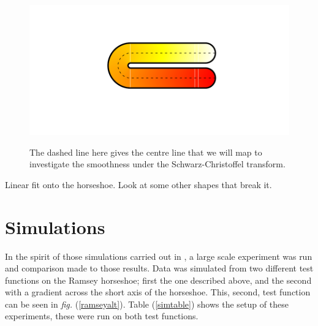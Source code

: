 \documentclass[a4paper,10pt]{amsart}
\newcommand{\sch}{Schwarz-Christoffel }
\newcommand{\fig}[1]{\emph{fig.} (\ref{#1})}
\begin{document}
\begin{figure}
\centering
\includegraphics[trim=0.5in 1in 0in 1in]{figs/horseshoecentreline.pdf} \\
\caption{The dashed line here gives the centre line that we will map to investigate the smoothness under the \sch transform.}
\label{horseshoecentreline}
\end{figure}



Linear fit onto the horseshoe.
Look at some other shapes that break it.


\section{Simulations}

In the spirit of those simulations carried out in \cite{soap}, a large scale experiment was run and comparison made to those results. Data was simulated from two different test functions on the Ramsey horseshoe; first the one described above, and the second with a gradient across the short axis of the horseshoe. This, second, test function can be seen in \fig{ramseyalt}. Table (\ref{simtable}) shows the setup of these experiments, these were run on both test functions.
\end{document}
